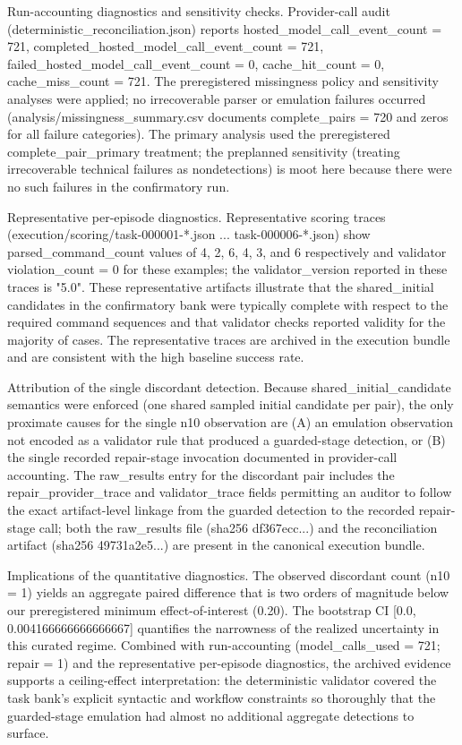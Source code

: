 \documentclass[conference]{IEEEtran}
\begin{document}
Run-accounting diagnostics and sensitivity checks. Provider-call audit (deterministic\_reconciliation.json) reports hosted\_model\_call\_event\_count = 721, completed\_hosted\_model\_call\_event\_count = 721, failed\_hosted\_model\_call\_event\_count = 0, cache\_hit\_count = 0, cache\_miss\_count = 721. The preregistered missingness policy and sensitivity analyses were applied; no irrecoverable parser or emulation failures occurred (analysis/missingness\_summary.csv documents complete\_pairs = 720 and zeros for all failure categories). The primary analysis used the preregistered complete\_pair\_primary treatment; the preplanned sensitivity (treating irrecoverable technical failures as nondetections) is moot here because there were no such failures in the confirmatory run.

Representative per-episode diagnostics. Representative scoring traces (execution/scoring/task-000001-*.json ... task-000006-*.json) show parsed\_command\_count values of 4, 2, 6, 4, 3, and 6 respectively and validator violation\_count = 0 for these examples; the validator\_version reported in these traces is "5.0". These representative artifacts illustrate that the shared\_initial candidates in the confirmatory bank were typically complete with respect to the required command sequences and that validator checks reported validity for the majority of cases. The representative traces are archived in the execution bundle and are consistent with the high baseline success rate.

Attribution of the single discordant detection. Because shared\_initial\_candidate semantics were enforced (one shared sampled initial candidate per pair), the only proximate causes for the single n10 observation are (A) an emulation observation not encoded as a validator rule that produced a guarded-stage detection, or (B) the single recorded repair-stage invocation documented in provider-call accounting. The raw\_results entry for the discordant pair includes the repair\_provider\_trace and validator\_trace fields permitting an auditor to follow the exact artifact-level linkage from the guarded detection to the recorded repair-stage call; both the raw\_results file (sha256 df367ecc...) and the reconciliation artifact (sha256 49731a2e5...) are present in the canonical execution bundle.

Implications of the quantitative diagnostics. The observed discordant count (n10 = 1) yields an aggregate paired difference that is two orders of magnitude below our preregistered minimum effect-of-interest (0.20). The bootstrap CI [0.0, 0.004166666666666667] quantifies the narrowness of the realized uncertainty in this curated regime. Combined with run-accounting (model\_calls\_used = 721; repair = 1) and the representative per-episode diagnostics, the archived evidence supports a ceiling-effect interpretation: the deterministic validator covered the task bank's explicit syntactic and workflow constraints so thoroughly that the guarded-stage emulation had almost no additional aggregate detections to surface.
\end{document}
